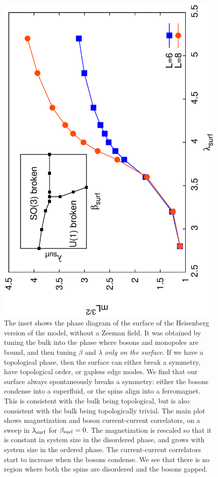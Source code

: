 \documentclass[prb,twocolumn]{revtex4}
\begin{document}
\begin{figure}
\includegraphics[angle=-90,width=0.9\linewidth]{figures/heissurf.eps}
\caption{The inset shows the phase diagram of the surface of the Heisenberg version of the model, without a Zeeman field. It was obtained by tuning the bulk into the phase where bosons and monopoles are bound, and then tuning $\beta$ and $\lambda$ {\em only on the surface}. If we have a topological phase, then the surface can either break a symmetry, have topological order, or gapless edge modes. We find that our surface always spontaneously breaks  a symmetry: either the bosons condense into a superfluid, or the spins align into a ferromagnet. This is consistent with the bulk being topological, but is also consistent with the bulk being topologically trivial. The main plot shows magnetization and boson current-current correlators, on a sweep in $\lambda_{\rm surf}$ for $\beta_{\rm surf}=0$. The magnetization is rescaled so that it is constant in system size in the disordered phase, and grows with system size in the ordered phase. The current-current correlators start to increase when the bosons condense. We see that there is no region where both the spins are disordered and the bosons gapped.}
\label{surfphase1}
\end{figure}
\end{document}

